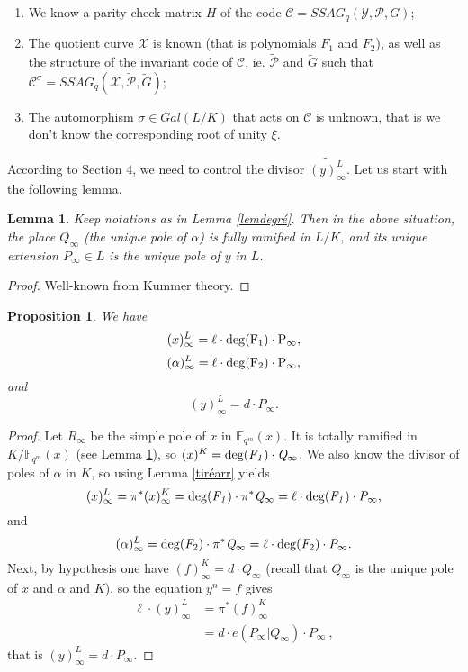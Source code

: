 \documentclass[10pt]{article}
\newtheorem{prop1}{Proposition}[]
\newtheorem{lem1}{Lemma}[]
\newcommand{\s}{\vspace{0.3cm}}
\newcommand{\cd}{\cdot}
\newcommand{\fqm}{\mathbb{F}_{q^m}}
\newcommand{\X}{\mathcal{X}}
\newcommand{\Y}{\mathcal{Y}}
\newcommand{\PR}{\mathcal{P}}
\begin{document}
\s

\begin{enumerate}
\item We know a parity check matrix $H$ of the code $\mathcal{C} = SSAG_q(\Y,\PR,G)$;
\item The quotient curve $\X$ is known (that is polynomials $F_1$ and $F_2$), as well as the structure of the invariant code of $\mathcal{C}$, ie. $\tilde{\PR}$ and $\tilde{G}$ such that $\mathcal{C}^{\sigma} = SSAG_q(\X,\tilde{\PR},\tilde{G})$;
\item The automorphism $\sigma \in Gal(L/K)$ that acts on $\mathcal{C}$ is unknown, that is we don't know the corresponding root of unity $\xi$.
\end{enumerate}

\s


According to Section $4$, we need to control the divisor $\widetilde{(y)^L_{\infty}}$. Let us start with the following lemma.

\s

\begin{lem1} \label{ramification}
Keep notations as in Lemma \ref{lemdegré}. Then in the above situation, the place $Q_{\infty}$ (the unique pole of $\alpha$) is fully ramified in $L/K$, and its unique extension $P_{\infty} \in L$ is the unique pole of $y$ in $L$. 
\end{lem1}

\s

\begin{proof}
Well-known from Kummer theory.
\end{proof}

\s

\begin{prop1} \label{propclé}
We have
\[(x)^L_{\infty} = \ell \cd \rm{deg}(F_1) \cd P_{\infty},\]
\[(\alpha)^L_{\infty} = \ell \cd \rm{deg}(F_2) \cd P_{\infty},\]
and
\[(y)^L_{\infty} = d \cd P_{\infty}.\]
\end{prop1}

\s

\begin{proof}
Let $R_{\infty}$ be the simple pole of $x$ in $\fqm(x)$. It is totally ramified in $K/\fqm(x)$ (see Lemma \ref{ramification}), so $(x)^K = \rm{deg}\it(F_1) \cd Q_{\infty}$. We also know the divisor of poles of $\alpha$ in $K$, so using Lemma \ref{tiréarr} yields
\[(x)^L_{\infty} = \pi^*(x)^K_{\infty} = \rm{deg}\it(F_1) \cd \pi^*Q_{\infty} = \ell \cd \rm{deg}\it(F_1) \cd P_{\infty},\]
and
\[(\alpha)^L_{\infty} = \rm{deg}\it(F_{\rm 2}) \cd \pi^*Q_{\infty} = \ell \cd \rm{deg}\it(F_{\rm 2}) \cd P_{\infty}.\]
Next, by hypothesis one have $(f)^K_{\infty} = d \cd Q_{\infty}$ (recall that $Q_{\infty}$ is the unique pole of $x$ and $\alpha$ and $K$), so the equation $y^n=f$ gives
\begin{align*} \ell \cd (y)^L_{\infty} &= \pi^*(f)^K_{\infty} \\
&= d \cd e(P_{\infty}|Q_{\infty}) \cd P_{\infty} \ ,
\end{align*}
that is $(y)^L_{\infty} = d \cd P_{\infty}.$
\end{proof}
\end{document}
